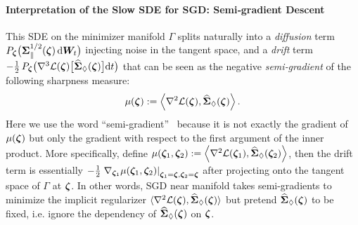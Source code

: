 \paragraph{Interpretation of the Slow SDE for SGD: Semi‐gradient Descent} This SDE on the minimizer manifold $\Gamma$ splits naturally into a \textit{diffusion} term $ P_{\bm{\zeta}}\bigl({\bm{\Sigma}}_{\parallel}^{1/2}({\bm{\zeta}})\,\mathrm{d}{\bm{W}}_t\bigr)$ injecting noise in the tangent space, and a \textit{drift} term $-\tfrac12\,P_{\bm{\zeta}}\bigl(\nabla^3\mathcal{L}({\bm{\zeta}})\bigl[\widehat{{\bm{\Sigma}}}_\Diamond({\bm{\zeta}})\bigr]\mathrm{d} t\bigr)$
that can be seen as the negative \emph{semi‐gradient} of the following sharpness measure:
\begin{align*}
    \mu({\bm{\zeta}}) := \left\langle{\nabla^2 \mathcal{L}({\bm{\zeta}})}, {\widehat{{\bm{\Sigma}}}_{\Diamond}({\bm{\zeta}})}\right\rangle.
\end{align*}
Here we use the word ``semi-gradient''~\citep{mnih2015human,brandfonbrener2019geometric} because it is not exactly the gradient of $\mu({\bm{\zeta}})$ but only the gradient with respect to the first argument of the inner product.
More specifically, define $\mu({\bm{\zeta}}_1, {\bm{\zeta}}_2) := \left\langle{\nabla^2 \mathcal{L}({\bm{\zeta}}_1)}, {\widehat{{\bm{\Sigma}}}_{\Diamond}({\bm{\zeta}}_2)}\right\rangle$, then the drift term is essentially $-\frac{1}{2}\left.\nabla_{{\bm{\zeta}}_1} \mu({\bm{\zeta}}_1, {\bm{\zeta}}_2)\right|_{{\bm{\zeta}}_1 = {\bm{\zeta}},{\bm{\zeta}}_2 = {\bm{\zeta}}}$ after projecting onto the tangent space of $\Gamma$ at ${\bm{\zeta}}$.
In other words, SGD near manifold takes semi-gradients to minimize the implicit regularizer $\langle \nabla^2 \mathcal{L}({\bm{\zeta}}),\widehat{{\bm{\Sigma}}}_{\Diamond}({\bm{\zeta}})\rangle$ but pretend $\widehat{{\bm{\Sigma}}}_{\Diamond}({\bm{\zeta}})$ to be fixed, i.e. ignore the dependency of $\widehat{{\bm{\Sigma}}}_{\Diamond}({\bm{\zeta}})$ on ${\bm{\zeta}}$.


